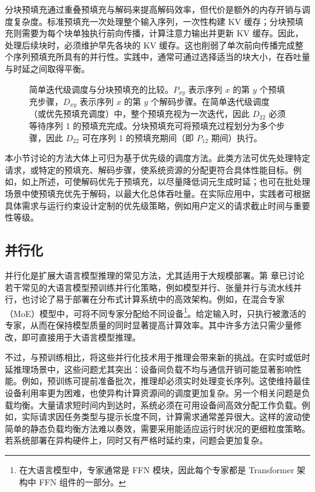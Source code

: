 分块预填充通过重叠预填充与解码来提高解码效率，但代价是额外的内存开销与调度复杂度。标准预填充一次处理整个输入序列，一次性构建 KV 缓存；分块预填充则需要为每个块单独执行前向传播，计算注意力输出并更新 KV 缓存。因此，处理后续块时，必须维护早先各块的 KV 缓存。这也削弱了单次前向传播完成整个序列预填充所具有的并行性。实践中，通常可通过选择适当的块大小，在吞吐量与时延之间取得平衡。


\begin{figure}[!t]
\centering

\vspace{-0.5cm} \caption{简单迭代级调度与分块预填充的比较。$P_{x y}$ 表示序列 $x$ 的第 $y$ 个预填充步骤，$D_{x y}$ 表示序列 $x$ 的第 $y$ 个解码步骤。在简单迭代级调度（或优先预填充调度）中，整个预填充视为一次迭代，因此 $D_{22}$ 必须等待序列 1 的预填充完成。分块预填充可将预填充过程划分为多个步骤，因此 $D_{22}$ 可在序列 1 的预填充期间（即 $P_{12}$ 期间）执行。}
\label{fig:llm-chunked-prefilling}
\end{figure}

本小节讨论的方法大体上可归为基于优先级的调度方法。此类方法可优先处理特定请求，或特定的预填充、解码步骤，使系统资源的分配更符合具体性能目标。例如，如上所述，可使解码优先于预填充，以尽量降低词元生成时延；也可在批处理场景中使预填充优先于解码，以最大化总体吞吐量。在实际应用中，实践者可根据具体需求与运行约束设计定制的优先级策略，例如用户定义的请求截止时间与重要性等级。

\subsection{并行化}

并行化是扩展大语言模型推理的常见方法，尤其适用于大规模部署。第 \ChapterPretraining 章已讨论若干常见的大语言模型预训练并行化策略，例如模型并行、张量并行与流水线并行，也讨论了易于部署在分布式计算系统中的高效架构。例如，在混合专家（MoE）模型中，可将不同专家分配给不同设备\footnote{在大语言模型中，专家通常是 FFN 模块，因此每个专家都是 Transformer 架构中 FFN 组件的一部分。}。给定输入时，只执行被激活的专家，从而在保持模型质量的同时显著提高计算效率。其中许多方法只需少量修改，即可直接用于大语言模型推理。

不过，与预训练相比，将这些并行化技术用于推理会带来新的挑战。在实时或低时延推理场景中，这些问题尤其突出：设备间负载不均与通信开销可能显著影响性能。例如，预训练可提前准备批次，推理却必须实时处理变长序列。这使维持最佳设备利用率更为困难，也使异构计算资源间的调度更加复杂。另一个相关问题是负载均衡。大量请求短时间内到达时，系统必须在可用设备间高效分配工作负载。例如，实际请求因任务类型与提示长度不同，计算需求通常差异很大。这样的波动使简单的静态负载均衡方法难以奏效，需要采用能适应运行时状况的更细粒度策略。若系统部署在异构硬件上，同时又有严格时延约束，问题会更加复杂。

